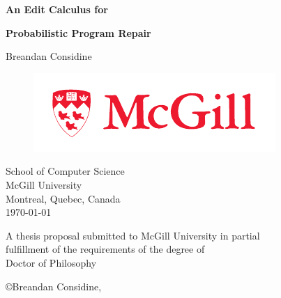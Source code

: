 


\begin{titlepage}
\begin{center}

\vspace*{0.5cm}


{\bfseries\LARGE An Edit Calculus for}
\vspace{0.35cm}

{\bfseries\LARGE Probabilistic Program Repair}
\vspace{0.15cm}

\vspace{1.8cm}

{\large Breandan Considine}

\vspace{1cm}
\begin{figure}[ht!]
    \centering
    \includegraphics[width=.6\linewidth]{images/mcgill_sig_red.pdf}
  \end{figure}
School of Computer Science\\
McGill University\\
Montreal, Quebec, Canada\\

\vspace{1.5cm}
\today


\vspace{1.0cm}
\noindent
A thesis proposal submitted to McGill University in partial\\
fulfillment of the requirements of the degree of\\
Doctor of Philosophy

\vspace{1.0cm}
{\small \copyright Breandan Considine, \the\year{}}


\end{center}
\end{titlepage}





